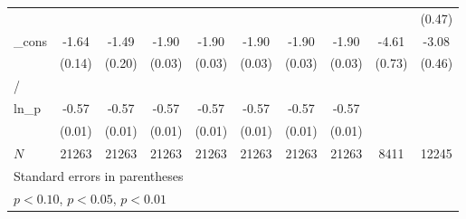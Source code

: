 \documentclass{article}
\begin{document}
{\begin{tabular}{l*{9}{c}}
            &                     &                     &                     &                     &                     &                     &                     &                     &      (0.47)         \\
[1em]
\_cons      &       -1.64\sym{***}&       -1.49\sym{***}&       -1.90\sym{***}&       -1.90\sym{***}&       -1.90\sym{***}&       -1.90\sym{***}&       -1.90\sym{***}&       -4.61\sym{***}&       -3.08\sym{***}\\
            &      (0.14)         &      (0.20)         &      (0.03)         &      (0.03)         &      (0.03)         &      (0.03)         &      (0.03)         &      (0.73)         &      (0.46)         \\
\hline
/           &                     &                     &                     &                     &                     &                     &                     &                     &                     \\
ln\_p        &       -0.57\sym{***}&       -0.57\sym{***}&       -0.57\sym{***}&       -0.57\sym{***}&       -0.57\sym{***}&       -0.57\sym{***}&       -0.57\sym{***}&                     &                     \\
            &      (0.01)         &      (0.01)         &      (0.01)         &      (0.01)         &      (0.01)         &      (0.01)         &      (0.01)         &                     &                     \\
\hline
\(N\)       &       21263         &       21263         &       21263         &       21263         &       21263         &       21263         &       21263         &        8411         &       12245         \\
\hline\hline
\multicolumn{10}{l}{\footnotesize Standard errors in parentheses}\\
\multicolumn{10}{l}{\footnotesize \sym{*} \(p<0.10\), \sym{**} \(p<0.05\), \sym{***} \(p<0.01\)}\\
\end{tabular}
}
\end{document}
